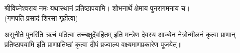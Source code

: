 श्रीविघ्नेश्वराय नमः यथास्थानं प्रतिष्ठापयामि। शोभनार्थे क्षेमाय पुनरागमनाय च।\\
(गणपति-प्रसादं शिरसा गृहीत्वा)





\begingroup
\renewcommand{\devaName}{देव}

\endgroup








असुनीते पुनरिति ऋचं पठित्वा तच्चक्षुर्देवहितम् इति मन्त्रेण देवस्य आज्येन नेत्रोन्मीलनं कृत्वा प्राणान् प्रतिष्ठापयामि इति प्राणप्रतिष्ठां कृत्वा दीपं प्रज्वाल्य वक्ष्यमाणप्रकारेण पूजयेत्॥

